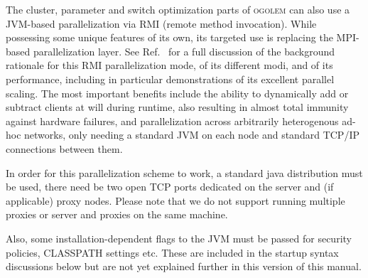 \documentclass[a4paper,10pt]{scrbook}
\newcommand{\ogo}{\textsc{ogolem}}
\begin{document}
The cluster, parameter and switch optimization parts of \ogo{} can also use a 
JVM-based parallelization via RMI (remote method invocation). While possessing
some unique features of its own, its targeted use is replacing the MPI-based
parallelization layer. See Ref.~ for a full discussion of the
background rationale for this RMI parallelization mode, of its different modi,
and of its performance, including in particular demonstrations of its
excellent parallel scaling. The most important
benefits include the ability to dynamically add or subtract clients at will
during runtime, also resulting in almost total immunity against hardware
failures, and parallelization across arbitrarily heterogenous ad-hoc networks,
only needing a standard JVM on each node and standard TCP/IP connections
between them.

In order for this parallelization scheme to work, a standard java distribution 
must be used, there need be two open TCP ports dedicated on the server and 
(if applicable) proxy nodes. Please note that we do not support running 
multiple proxies or server and proxies on the same machine.

Also, some installation-dependent flags to the JVM must be passed for security 
policies, CLASSPATH settings etc. These are included in the startup syntax
discussions below but are not yet explained further in this version of this
manual. 
\end{document}
